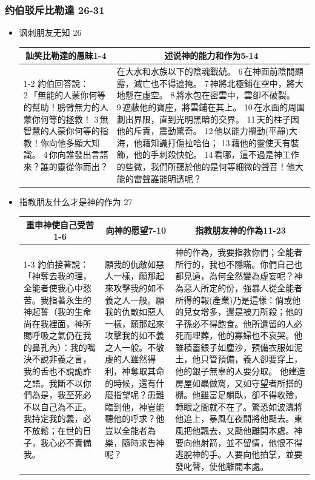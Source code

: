 \subsubsection{约伯驳斥比勒達 26-31}
\begin{itemize}
\itemsep-.45em 
\item 讽刺朋友无知 26
\begin{table}[H]
\centering 
\begin{tabular}{p{}|p{}}    \toprule 
\multicolumn{1}{c|}{訕笑比勒達的愚昧1-4}& \multicolumn{1}{c}{述说神的能力和作为5-14}\\\cline{1-2}
約伯回答說： 2 「無能的人蒙你何等的幫助！膀臂無力的人蒙你何等的拯救！ 3 無智慧的人蒙你何等的指教！你向他多顯大知識。 4 你向誰發出言語來？誰的靈從你而出？
&在大水和水族以下的陰魂戰兢。 6 在神面前陰間顯露，滅亡也不得遮掩。 7 神將北極鋪在空中，將大地懸在虛空。 8 將水包在密雲中，雲卻不破裂。 9 遮蔽他的寶座，將雲鋪在其上。 10 在水面的周圍劃出界限，直到光明黑暗的交界。 11 天的柱子因他的斥責，震動驚奇。 12 他以能力攪動(平靜)大海，他藉知識打傷拉哈伯； 13 藉他的靈使天有裝飾，他的手刺殺快蛇。 14 看哪，這不過是神工作的些微，我們所聽於他的是何等細微的聲音！他大能的雷聲誰能明透呢？\\ \bottomrule
\end{tabular} 
\end{table}
\item 指教朋友什么才是神的作为 27
\begin{table}[H]
\centering 
\begin{tabular}{p{}|p{10.5em}|p{25.6em}}    \toprule 
\multicolumn{1}{c|}{重申神使自己受苦1-6}& \multicolumn{1}{c|}{向神的愿望7-10}&\multicolumn{1}{c}{指教朋友神的作為11-23}\\\cline{1-3}
約伯接著說：「神奪去我的理，全能者使我心中愁苦。我指著永生的神起誓（我的生命尚在我裡面，神所賜呼吸之氣仍在我的鼻孔內）：我的嘴決不說非義之言，我的舌也不說詭詐之語。我斷不以你們為是，我至死必不以自己為不正。我持定我的義，必不放鬆；在世的日子，我心必不責備我。
&願我的仇敵如惡人一樣，願那起來攻擊我的如不義之人一般。願我的仇敵如惡人一樣，願那起來攻擊我的如不義之人一般。不敬虔的人雖然得利，神奪取其命的時候，還有什麼指望呢？患難臨到他，神豈能聽他的呼求？他豈以全能者為樂，隨時求告神呢？
&神的作為，我要指教你們；全能者所行的，我也不隱瞞。你們自己也都見過，為何全然變為虛妄呢？神為惡人所定的份，強暴人從全能者所得的報(產業)乃是這樣：倘或他的兒女增多，還是被刀所殺；他的子孫必不得飽食。他所遺留的人必死而埋葬，他的寡婦也不哀哭。他雖積蓄銀子如塵沙，預備衣服如泥土，他只管預備，義人卻要穿上，他的銀子無辜的人要分取。 他建造房屋如蟲做窩，又如守望者所搭的棚。他雖富足躺臥，卻不得收殮，轉眼之間就不在了。驚恐如波濤將他追上，暴風在夜間將他颳去。東風把他飄去，又颳他離開本處。神要向他射箭，並不留情，他恨不得逃脫神的手。人要向他拍掌，並要發叱聲，使他離開本處。\\ \bottomrule
\end{tabular} 
\end{table}


\end{itemize}
